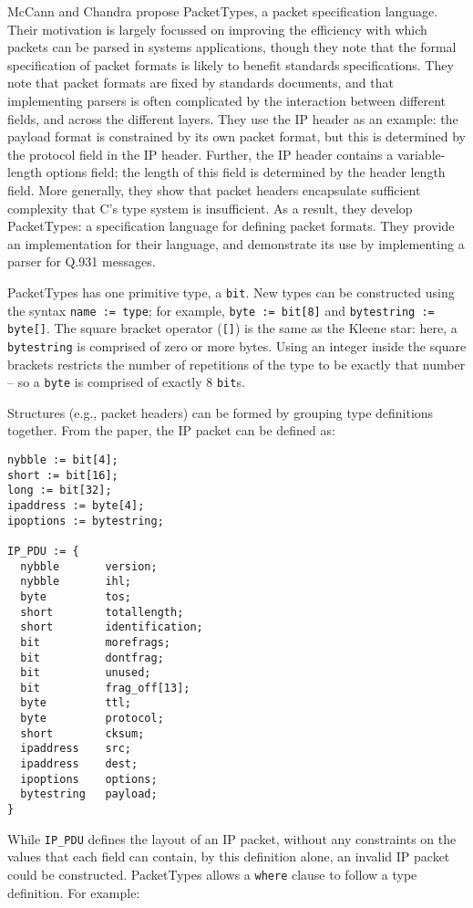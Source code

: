\documentclass[10pt]{article}
\begin{document}
McCann and Chandra propose PacketTypes, a packet specification language. Their motivation
is largely focussed on improving the efficiency with which packets can be parsed in
systems applications, though they note that the formal specification of packet formats is
likely to benefit standards specifications. They note that packet formats are fixed by
standards documents, and that implementing parsers is often complicated by the interaction
between different fields, and across the different layers. They use the IP header as an
example: the payload format is constrained by its own packet format, but this is
determined by the protocol field in the IP header. Further, the IP header contains a
variable-length options field; the length of this field is determined by the header length
field. More generally, they show that packet headers encapsulate sufficient complexity
that C's type system is insufficient. As a result, they develop PacketTypes: a
specification language for defining packet formats. They provide an implementation for
their language, and demonstrate its use by implementing a parser for Q.931 messages. 

PacketTypes has one primitive type, a \texttt{bit}. New types can be constructed using the
syntax \texttt{name := type}; for example, \texttt{byte := bit[8]} and
\texttt{bytestring := byte[]}. The square bracket operator (\texttt{[]}) is the same as
the Kleene star: here, a \texttt{bytestring} is comprised of zero or more bytes. Using
an integer inside the square brackets restricts the number of repetitions of the type to
be exactly that number -- so a \texttt{byte} is comprised of exactly 8 \texttt{bit}s.

Structures (e.g., packet headers) can be formed by grouping type definitions together.
From the paper, the IP packet can be defined as:
\begin{verbatim}
nybble := bit[4];
short := bit[16];
long := bit[32];
ipaddress := byte[4];
ipoptions := bytestring;

IP_PDU := {
  nybble       version;
  nybble       ihl;
  byte         tos;
  short        totallength;
  short        identification;
  bit          morefrags;
  bit          dontfrag;
  bit          unused;
  bit          frag_off[13];
  byte         ttl;
  byte         protocol;
  short        cksum;
  ipaddress    src;
  ipaddress    dest;
  ipoptions    options;
  bytestring   payload;
}
\end{verbatim}

While \texttt{IP\_PDU} defines the layout of an IP packet, without any constraints on the
values that each field can contain, by this definition alone, an invalid IP packet could
be constructed. PacketTypes allows a \texttt{where} clause to follow a type definition.
For example:
\end{document}
